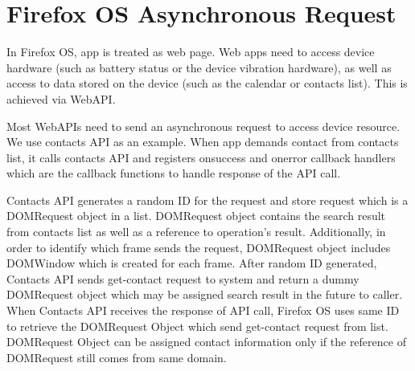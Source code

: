 \documentclass[12pt]{article}
\begin{document}
\section*{Firefox OS Asynchronous Request}
In Firefox OS, app is treated as web page. Web apps need to access device hardware (such as battery status or the device vibration hardware), as well as access to data stored on the device (such as the calendar or contacts list). This is achieved via WebAPI. %

Most WebAPIs need to send an asynchronous request to access device resource. We use contacts API as an example. When app demands contact from contacts list,  it calls contacts API and registers onsuccess and onerror callback handlers which are the callback functions to handle response of the API call. %

Contacts API generates a random ID for the request and store request which is a DOMRequest object in a list. DOMRequest object contains the search result from contacts list as well as a reference to operation's result. Additionally, in order to identify which frame sends the request, DOMRequest object includes DOMWindow which is created for each frame. After random ID generated, Contacts API sends get-contact request to system and return a dummy DOMRequest object which may be assigned  search result in the future to caller.  %
When Contacts API receives the response of API call, Firefox OS uses same ID to retrieve the DOMRequest Object which send get-contact request from list. DOMRequest Object can be assigned contact information only if the reference of DOMRequest still comes from same domain.   %
\end{document}
